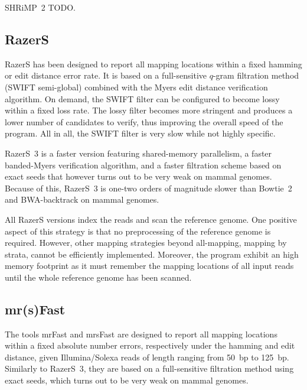 SHRiMP~2 TODO.


\subsection{RazerS}

RazerS \citep{Weese2009} has been designed to report all mapping locations within a fixed hamming or edit distance error rate.
It is based on a full-sensitive $q$-gram filtration method (SWIFT semi-global) combined with the Myers edit distance verification algorithm.
On demand, the SWIFT filter can be configured to become lossy within a fixed loss rate.
The lossy filter becomes more stringent and produces a lower number of candidates to verify, thus improving the overall speed of the program.
All in all, the SWIFT filter is very slow while not highly specific.

RazerS~3 \citep{RazerS3} is a faster version featuring shared-memory parallelism, a faster banded-Myers verification algorithm, and a faster filtration scheme based on exact seeds that however turns out to be very weak on mammal genomes.
Because of this, RazerS~3 is one-two orders of magnitude slower than Bowtie~2 and BWA-backtrack on mammal genomes.

All RazerS versions index the reads and scan the reference genome.
One positive aspect of this strategy is that no preprocessing of the reference genome is required.
However, other mapping strategies beyond all-mapping, \eg mapping by strata, cannot be efficiently implemented.
Moreover, the program exhibit an high memory footprint as it must remember the mapping locations of all input reads until the whole reference genome has been scanned.


\subsection{mr(s)Fast}

The tools mrFast \citep{Ahmadi2011} and mrsFast \citep{Hach2010} are designed to report all mapping locations within a fixed absolute number errors, respectively under the hamming and edit distance, given Illumina/Solexa reads of length ranging from 50~bp to 125~bp.
Similarly to RazerS~3, they are based on a full-sensitive filtration method using exact seeds, which turns out to be very weak on mammal genomes.

